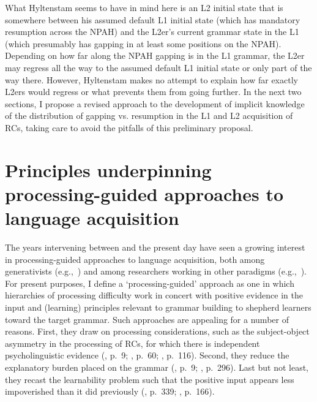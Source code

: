 What Hyltenstam seems to have in mind here is an L2 initial state that is somewhere between his assumed default L1 initial state (which has mandatory resumption across the NPAH) and the L2er's current grammar state in the L1 (which presumably has gapping in at least some positions on the NPAH). Depending on how far along the NPAH gapping is in the L1 grammar, the L2er may regress all the way to the assumed default L1 initial state or only part of the way there. However, Hyltenstam makes no attempt to explain how far exactly L2ers would regress or what prevents them from going further. In the next two sections, I propose a revised approach to the development of implicit knowledge of the distribution of gapping vs. resumption in the L1 and L2 acquisition of RCs, taking care to avoid the pitfalls of this preliminary proposal.

\section{Principles underpinning processing-guided approaches to language acquisition}\label{acq-principles}

The years intervening between \textcite{hyltenstam1984,hyltenstam1990} and the present day have seen a growing interest in processing-guided approaches to language acquisition, both among generativists (e.g.,~\cite{chomsky2017}) and among researchers working in other paradigms (e.g.,~\cite{ogrady2005}). For present purposes, I define a `processing-guided' approach as one in which hierarchies of processing difficulty work in concert with positive evidence in the input and (learning) principles relevant to grammar building to shepherd learners toward the target grammar. Such approaches are appealing for a number of reasons. First, they draw on processing considerations, such as the subject-object asymmetry in the processing of RCs, for which there is independent psycholinguistic evidence (\cite{hawkins2004}, p.~9; \cite{ogrady2022a}, p.~60; \cite{yang.etal2017}, p.~116). Second, they reduce the explanatory burden placed on the grammar (\cite{chomsky2005}, p.~9; \cite{chomsky2017}, p.~296). Last but not least, they recast the learnability problem such that the positive input appears less impoverished than it did previously (\cite{hawkins2007}, p.~339; \cite{ogrady2005}, p.~166). 

